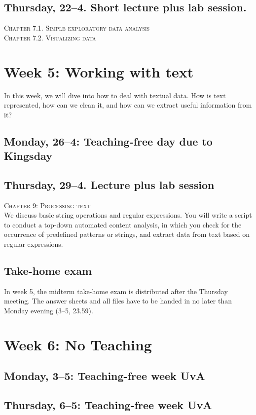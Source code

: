 \subsection*{Thursday, 22--4.  Short lecture plus lab session.}
\textsc{ Chapter 7.1. Simple exploratory data analysis}\\
\textsc{ Chapter 7.2. Visualizing data}\\

\section*{Week 5: Working with text}

In this week, we will dive into how to deal with textual data. How is text represented, how can we clean it, and how can we extract useful information from it?

\subsection*{Monday, 26--4: Teaching-free day due to Kingsday}

\subsection*{Thursday, 29--4. Lecture plus lab session}
\textsc{ Chapter 9: Processing text}\\
We discuss basic string operations and regular expressions. You will write a script to conduct a top-down automated content analysis, in which you check for the occurrence of predefined patterns or strings, and extract data from text based on regular expressions.

\subsection*{Take-home exam}
In week 5, the midterm take-home exam is distributed after the Thursday meeting. The answer sheets and all files have to be handed in no later than Monday evening (3--5, 23.59).

\section*{Week 6: No Teaching}
\subsection*{Monday, 3--5: Teaching-free week UvA}
\subsection*{Thursday, 6--5: Teaching-free week UvA}

